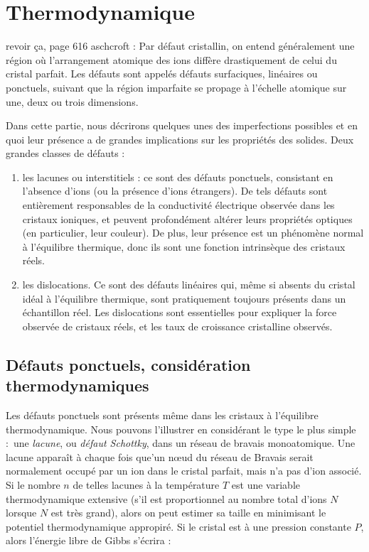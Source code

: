 \chapter{Thermodynamique}

\TODO revoir ça, page 616 aschcroft :
Par défaut cristallin, on entend généralement une région où l'arrangement atomique des ions diffère drastiquement de celui du cristal parfait. Les défauts sont appelés défauts surfaciques, linéaires ou ponctuels, suivant que la région imparfaite se propage à l'échelle atomique sur une, deux ou trois dimensions.

Dans cette partie, nous décrirons quelques unes des imperfections possibles et en quoi leur présence a de grandes implications sur les propriétés des solides.
Deux grandes classes de défauts :

\begin{enumerate}
    \item les lacunes ou interstitiels : ce sont des défauts ponctuels, consistant en l'absence d'ions (ou la présence d'ions étrangers). De tels défauts sont entièrement responsables de la conductivité électrique observée dans les cristaux ioniques, et peuvent profondément altérer leurs propriétés optiques (en particulier, leur couleur). De plus, leur présence est un phénomène normal à l'équilibre thermique, donc ils sont une fonction intrinsèque des cristaux réels.
    \item les dislocations. Ce sont des défauts linéaires qui, même si absents du cristal idéal à l'équilibre thermique, sont pratiquement toujours présents dans un échantillon réel. Les dislocations sont essentielles pour expliquer la force observée de cristaux réels, et les taux de croissance cristalline observés.
\end{enumerate}

\section{Défauts ponctuels, considération thermodynamiques}

Les défauts ponctuels sont présents même dans les cristaux à l'équilibre thermodynamique. Nous pouvons l'illustrer en considérant le type le plus simple : une \emph{lacune}, ou \emph{défaut Schottky}, dans un réseau de bravais monoatomique. Une lacune apparaît à chaque fois que'un nœud du réseau de Bravais serait normalement occupé par un ion dans le cristal parfait, mais n'a pas d'ion associé. Si le nombre $n$ de telles lacunes à la température $T$ est une variable thermodynamique extensive (\ie s'il est proportionnel au nombre total d'ions $N$ lorsque $N$ est très grand), alors on peut estimer sa taille en minimisant le potentiel thermodynamique appropiré. Si le cristal est à une pression constante $P$, alors l'énergie libre de Gibbs s'écrira :


